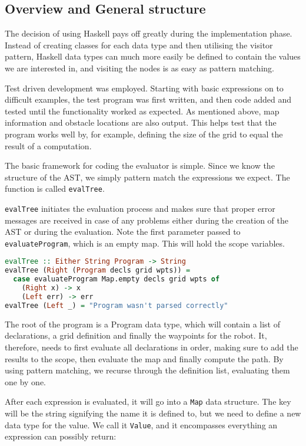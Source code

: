 \subsection{Overview and General structure}\label{Evaluator:Impl:GeneralStructure}

The decision of using Haskell pays off greatly during the implementation phase. Instead of creating classes for each data type and then utilising the visitor pattern, Haskell data types can much more easily be defined to contain the values we are interested in, and visiting the nodes is as easy as pattern matching. 

Test driven development was employed. Starting with basic expressions on to difficult examples, the test program was first written, and then code added and tested until the functionality worked as expected. As mentioned above, map information and obstacle locations are also output. This helps test that the program works well by, for example, defining the size of the grid to equal the result of a computation.

The basic framework for coding the evaluator is simple. Since we know the structure of the AST, we simply pattern match the expressions we expect. The function is called \lstinline{evalTree}. 

\lstinline{evalTree} initiates the evaluation process and makes sure that proper error messages are received in case of any problems either during the creation of the AST or during the evaluation. Note the first parameter passed to \lstinline{evaluateProgram}, which is an empty map. This will hold the scope variables.

\begin{lstlisting}[language=haskell]
evalTree :: Either String Program -> String
evalTree (Right (Program decls grid wpts)) =
  case evaluateProgram Map.empty decls grid wpts of
    (Right x) -> x
    (Left err) -> err
evalTree (Left _) = "Program wasn't parsed correctly"
\end{lstlisting}

The root of the program is a Program data type, which will contain a list of declarations, a grid definition and finally the waypoints for the robot. It, therefore, needs to first evaluate all declarations in order, making sure to add the results to the scope, then evaluate the map and finally compute the path. By using pattern matching, we recurse through the definition list, evaluating them one by one.
\par
After each expression is evaluated, it will go into a \lstinline{Map} data structure. The key will be the string signifying the name it is defined to, but we need to define a new data type for the value. We call it \lstinline{Value}, and it encompasses everything an expression can possibly return:

